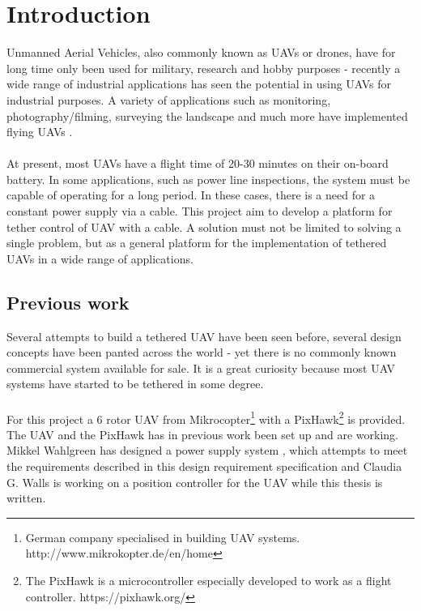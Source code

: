 \chapter{Introduction}

Unmanned Aerial Vehicles, also commonly known as UAVs or drones, have for long time only been used for military, research and hobby purposes - recently a wide range of industrial applications has seen the potential in using UAVs for industrial purposes.
A variety of applications such as monitoring, photography/filming, surveying the landscape and much more have implemented flying UAVs \cite{Dandrone2015}.\\
\\
At present, most UAVs have a flight time of 20-30 minutes on their on-board battery.
In some applications, such as power line inspections, the system must be capable of operating for a long period. In these cases, there is a need for a constant power supply via a cable. This project aim to develop a platform for tether control of UAV with a cable.
A solution must not be limited to solving a single problem, but as a general platform for the implementation of tethered UAVs in a wide range of applications.


\section{Previous work}
Several attempts to build a tethered UAV have been seen before, several design concepts have been panted across the world \cite{Peverill2013} - yet there is no commonly known commercial system available for sale. It is a great curiosity because most UAV systems have started to be tethered in some degree.\\
\\
For this project a 6 rotor UAV from Mikrocopter\footnote{German company specialised in building UAV systems. http://www.mikrokopter.de/en/home} with a PixHawk\footnote{The PixHawk is a microcontroller especially developed to work as a flight controller. https://pixhawk.org/} is provided. The UAV and the PixHawk has in previous work been set up and are working.\\
\noindent
Mikkel Wahlgreen has designed a power supply system \cite{Wahlgreen2014}, which attempts to meet the requirements described in this design requirement specification and Claudia G. Walls is working on a position controller for the UAV while this thesis is written.\\

